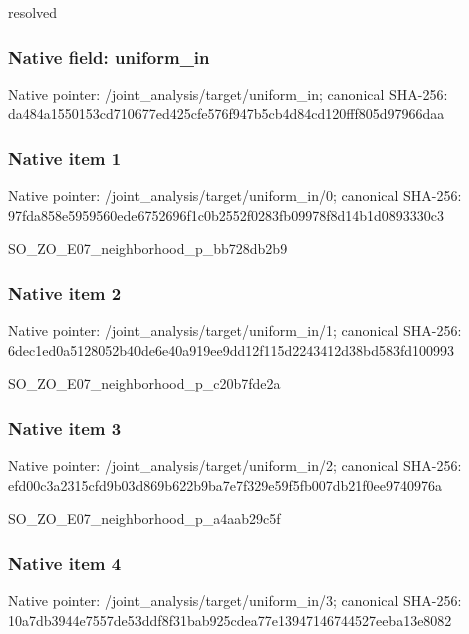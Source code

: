 \documentclass[10pt,a4paper]{article}
\begin{document}
\begingroup\raggedright\sloppy resolved\par\endgroup

\subsubsection{Native field: uniform\_\allowbreak{}in}
Native pointer: /joint\_\allowbreak{}analysis/target/uniform\_\allowbreak{}in; canonical SHA-256: da484a1550153cd710677ed425cfe576f947b5cb4d84cd120fff805d97966daa

\subsubsection{Native item 1}
Native pointer: /joint\_\allowbreak{}analysis/target/uniform\_\allowbreak{}in/0; canonical SHA-256: 97fda858e5959560ede6752696f1c0b2552f0283fb09978f8d14b1d0893330c3

\begingroup\raggedright\sloppy SO\_\allowbreak{}ZO\_\allowbreak{}E07\_\allowbreak{}neighborhood\_\allowbreak{}p\_\allowbreak{}bb728db2b9\par\endgroup

\subsubsection{Native item 2}
Native pointer: /joint\_\allowbreak{}analysis/target/uniform\_\allowbreak{}in/1; canonical SHA-256: 6dec1ed0a5128052b40de6e40a919ee9dd12f115d2243412d38bd583fd100993

\begingroup\raggedright\sloppy SO\_\allowbreak{}ZO\_\allowbreak{}E07\_\allowbreak{}neighborhood\_\allowbreak{}p\_\allowbreak{}c20b7fde2a\par\endgroup

\subsubsection{Native item 3}
Native pointer: /joint\_\allowbreak{}analysis/target/uniform\_\allowbreak{}in/2; canonical SHA-256: efd00c3a2315cfd9b03d869b622b9ba7e7f329e59f5fb007db21f0ee9740976a

\begingroup\raggedright\sloppy SO\_\allowbreak{}ZO\_\allowbreak{}E07\_\allowbreak{}neighborhood\_\allowbreak{}p\_\allowbreak{}a4aab29c5f\par\endgroup

\subsubsection{Native item 4}
Native pointer: /joint\_\allowbreak{}analysis/target/uniform\_\allowbreak{}in/3; canonical SHA-256: 10a7db3944e7557de53ddf8f31bab925cdea77e13947146744527eeba13e8082
\end{document}
